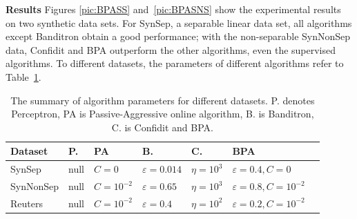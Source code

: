 \documentclass[preprint,12pt,authoryear]{elsarticle}
\begin{document}

\textbf{Results}
Figures \ref{pic:BPASS} and~\ref{pic:BPASNS} show the experimental results on two synthetic data sets. For SynSep, a separable linear data set, all algorithms except Banditron obtain a good performance; with the non-separable SynNonSep data, Confidit and BPA outperform the other algorithms, even the supervised algorithms.  To different datasets, the parameters of different algorithms refer to Table~\ref{table:bpa}.
\begin{table}[h]
	\caption{The summary of algorithm parameters for different datasets. P. denotes Perceptron, PA is Passive-Aggressive online algorithm, B. is Banditron, C. is Confidit and BPA.}
	\label{table:bpa}
	\begin{center}
		\begin{tabular}{lllllll}
			{\bf Dataset}  & {\bf P.} & {\bf PA } & {\bf B.}& {\bf C.} & {\bf BPA}\\
			\hline
			SynSep & null & $C=0$ & $\varepsilon = 0.014$ &$\eta = 10^3$ & $\varepsilon = 0.4,C = 0$\\
			
			SynNonSep & null & $C=10^{-2}$ & $\varepsilon =0.65$ & $\eta = 10^3$& $\varepsilon = 0.8,C = 10^{-2}$\\
			
			Reuters & null & $C=10^{-2}$ & $\varepsilon =0.4$ & $\eta = 10^2$ & $\varepsilon = 0.2,C = 10^{-2}$\\
			
			
			
		\end{tabular}
	\end{center}
\end{table}
\end{document}
